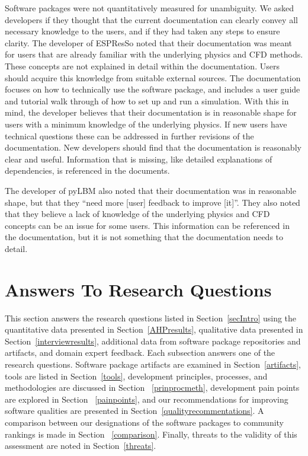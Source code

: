 \documentclass[final, 3p, times, authoryear]{elsarticle}
\begin{document}
Software packages were not quantitatively measured for unambiguity. We asked
developers if they thought that the current documentation can clearly convey all
necessary knowledge to the users, and if they had taken any steps to ensure
clarity. The developer of ESPResSo noted that their documentation was meant for
users that are already familiar with the underlying physics and CFD methods.
These concepts are not explained in detail within the documentation. Users
should acquire this knowledge from suitable external sources. The documentation
focuses on how to technically use the software package, and includes a user
guide and tutorial walk through of how to set up and run a simulation. With this
in mind, the developer believes that their documentation is in reasonable shape
for users with a minimum knowledge of the underlying physics. If new users have
technical questions these can be addressed in further revisions of the
documentation. New developers should find that the documentation is reasonably
clear and useful. Information that is missing, like detailed explanations of
dependencies, is referenced in the documents. 

The developer of pyLBM also noted that their documentation was in reasonable
shape, but that they ``need more [user] feedback to improve [it]''. They also
noted that they believe a lack of knowledge of the underlying physics and CFD
concepts can be an issue for some users. This information can be referenced in
the documentation, but it is not something that the documentation needs to
detail. 

\section{Answers To Research Questions} \label{answersquestions}

This section answers the research questions listed in Section~\ref{secIntro}
using the quantitative data presented in Section~\ref{AHPresults}, qualitative
data presented in Section~\ref{interviewresults}, additional data from software
package repositories and artifacts, and domain expert feedback. Each subsection
answers one of the research questions. Software package artifacts are examined
in Section~\ref{artifacts}, tools are listed in Section~\ref{tools}, development
principles, processes, and methodologies are discussed in Section
~\ref{prinprocmeth}, development pain points are explored in Section
~\ref{painpoints}, and our recommendations for improving software qualities are
presented in Section~\ref{qualityrecommentations}. A comparison between our
designations of the software packages to community rankings is made in Section
~\ref{comparison}. Finally, threats to the validity of this assessment are noted
in Section~\ref{threats}.
\end{document}
